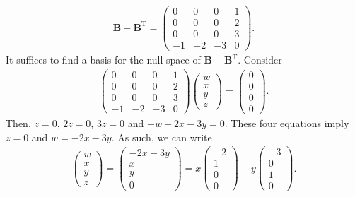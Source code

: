 \documentclass[12pt]{article}
\begin{document}
\begin{enumerate}[label=\textbf{(\alph*)}]
\begin{enumerate}[label=\textbf{(\roman*)}]
\begin{align*}
    \mathbf{B}-\mathbf{B}^\text{T}=\begin{pmatrix}
        0 & 0 & 0 & 1 \\ 0 & 0 & 0 & 2 \\ 0 & 0 & 0 & 3 \\ -1 & -2 & -3 & 0
    \end{pmatrix}.
\end{align*}
 It suffices to find a basis for the null space of $\mathbf{B}-\mathbf{B}^\text{T}$. Consider \begin{align*}
     \begin{pmatrix}
        0 & 0 & 0 & 1 \\ 0 & 0 & 0 & 2 \\ 0 & 0 & 0 & 3 \\ -1 & -2 & -3 & 0
    \end{pmatrix}\begin{pmatrix}
        w \\x\\y\\z
    \end{pmatrix}=\begin{pmatrix}
        0\\0\\0\\0
    \end{pmatrix}.
 \end{align*}
 Then, $z=0$, $2z=0$, $3z=0$ and $-w-2x-3y=0$. These four equations imply $z=0$ and $w=-2x-3y$. As such, we can write \begin{align*}
     \begin{pmatrix}
         w\\x\\y\\z
     \end{pmatrix}=\begin{pmatrix}
         -2x-3y\\x\\y\\0
     \end{pmatrix}=x\begin{pmatrix}
         -2\\1\\0\\0
     \end{pmatrix}+y\begin{pmatrix}
         -3\\0\\1\\0
     \end{pmatrix}.

\end{align*}
\end{enumerate}
\end{enumerate}
\end{document}
